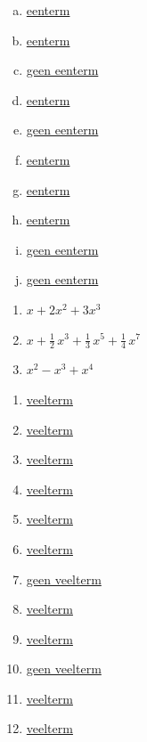 \documentclass{ximera}
\begin{document}
\begin{Antwoord} \label{antw1.1}
\begin{enumerate}[(a)]
\item
\hyperlink{oef1.1}{eenterm}
\item
\hyperlink{oef1.1}{eenterm}
\item
\hyperlink{oef1.1}{geen eenterm}
\item
\hyperlink{oef1.1}{eenterm}
\item
\hyperlink{oef1.1}{geen eenterm}
\item
\hyperlink{oef1.1}{eenterm}
\item\hyperlink{oef1.1}{eenterm}
\item
\hyperlink{oef1.1}{eenterm}
\item
\hyperlink{oef1.1}{geen eenterm}
\item
\hyperlink{oef1.1}{geen eenterm}
\end{enumerate}
\end{Antwoord}

\begin{Antwoord} \label{antw1.2}
\begin{enumerate}
\item
\hyperlink{oef1.2}{$x + 2x^2 + 3x^3$}
\item
\hyperlink{oef1.2}{$x + \frac{1}{2}\,x^3 + \frac{1}{3}\,x^5 + \frac{1}{4}\,x^7$}
\item
\hyperlink{oef1.2}{$x^2 - x^3 + x^4$}
\end{enumerate}
\end{Antwoord}

\begin{Antwoord} \label{antw1.3}
\begin{enumerate}
\item
\hyperlink{oef1.3}{veelterm}
\item
\hyperlink{oef1.3}{veelterm}
\item
\hyperlink{oef1.3}{veelterm}
\item
\hyperlink{oef1.3}{veelterm}
\item
\hyperlink{oef1.3}{veelterm}
\item
\hyperlink{oef1.3}{veelterm}
\item
\hyperlink{oef1.3}{geen veelterm}
\item
\hyperlink{oef1.3}{veelterm}
\item
\hyperlink{oef1.3}{veelterm}
\item
\hyperlink{oef1.3}{geen veelterm}
\item
\hyperlink{oef1.3}{veelterm}
\item
\hyperlink{oef1.3}{veelterm}
\end{enumerate}
\setcounter{enumi}{4}
\end{Antwoord}
\end{document}

